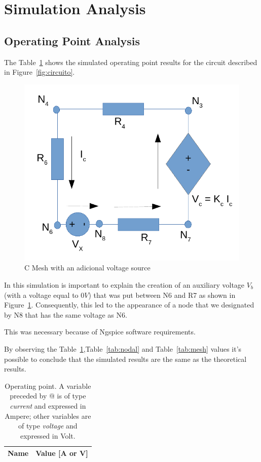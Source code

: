 \section{Simulation Analysis}
\label{sec:simulation}

\subsection{Operating Point Analysis}


The Table~\ref{tab:op} shows the simulated operating point results for the circuit described in Figure~\ref{fig:circuito}.

\begin{figure}[h] \centering
\includegraphics[width=0.6\linewidth]{malhaC.pdf}
\caption{C Mesh with an adicional voltage source} %
\label{fig:malhaC}
\end{figure}

In this simulation is important to explain the creation of an auxiliary voltage $V_b$ (with a voltage equal to $0V$) that was put between N6 and R7 as shown in Figure~\ref{fig:malhaC}. Consequently, this led to the appearance of a node that we designated by N8 that has the same voltage as N6.

This was necessary because of Ngspice software requirements.

By observing the Table~\ref{tab:op},Table~\ref{tab:nodal} and Table~\ref{tab:mesh} values it's possible to conclude that the simulated results are the same as the theoretical results.%

\begin{table}[h]
  \centering
  \begin{tabular}{|l|r|}
    \hline    
    {\bf Name} & {\bf Value [A or V]} \\ \hline
    
  \end{tabular}
  \caption{Operating point. A variable preceded by @ is of type {\em current}
    and expressed in Ampere; other variables are of type {\it voltage} and expressed in
    Volt.}
  \label{tab:op}
\end{table}

